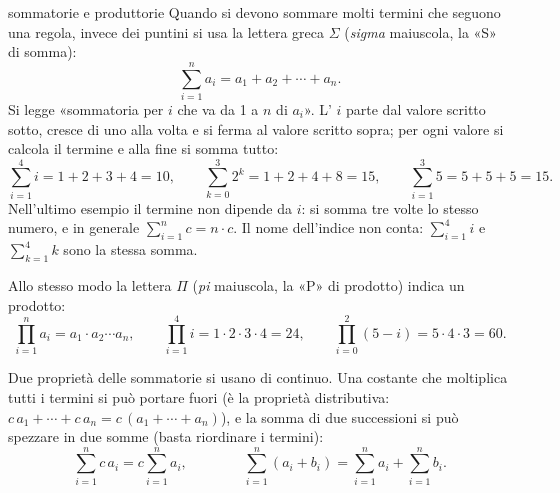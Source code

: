 \begin{richiamo}{sommatorie e produttorie}
Quando si devono sommare molti termini che seguono una regola, invece dei puntini si usa la lettera greca $\Sigma$
(\emph{sigma} maiuscola, la «S» di somma):
\[ \sum_{i=1}^{n} a_i = a_1 + a_2 + \cdots + a_n . \]
Si legge «sommatoria per $i$ che va da 1 a $n$ di $a_i$». L' $i$ parte dal valore scritto sotto, cresce
di uno alla volta e si ferma al valore scritto sopra; per ogni valore si calcola il termine e alla fine si somma
tutto:
\[
  \sum_{i=1}^{4} i = 1 + 2 + 3 + 4 = 10, \qquad
  \sum_{k=0}^{3} 2^k = 1 + 2 + 4 + 8 = 15, \qquad
  \sum_{i=1}^{3} 5 = 5 + 5 + 5 = 15 .
\]
Nell'ultimo esempio il termine non dipende da $i$: si somma tre volte lo stesso numero, e in generale
$\sum_{i=1}^{n} c = n \cdot c$. Il nome dell'indice non conta: $\sum_{i=1}^{4} i$ e $\sum_{k=1}^{4} k$ sono la stessa
somma.

Allo stesso modo la lettera $\Pi$ (\emph{pi} maiuscola, la «P» di prodotto) indica un prodotto:
\[
  \prod_{i=1}^{n} a_i = a_1 \cdot a_2 \cdots a_n, \qquad
  \prod_{i=1}^{4} i = 1 \cdot 2 \cdot 3 \cdot 4 = 24, \qquad
  \prod_{i=0}^{2} (5 - i) = 5 \cdot 4 \cdot 3 = 60 .
\]

Due proprietà delle sommatorie si usano di continuo. Una costante che moltiplica tutti i termini si può portare fuori
(è la proprietà distributiva: $c\,a_1 + \cdots + c\,a_n = c\,(a_1 + \cdots + a_n)$), e la somma di due successioni si
può spezzare in due somme (basta riordinare i termini):
\[
  \sum_{i=1}^{n} c\, a_i = c \sum_{i=1}^{n} a_i ,
  \qquad\qquad
  \sum_{i=1}^{n} (a_i + b_i) = \sum_{i=1}^{n} a_i + \sum_{i=1}^{n} b_i .
\]
\end{richiamo}

